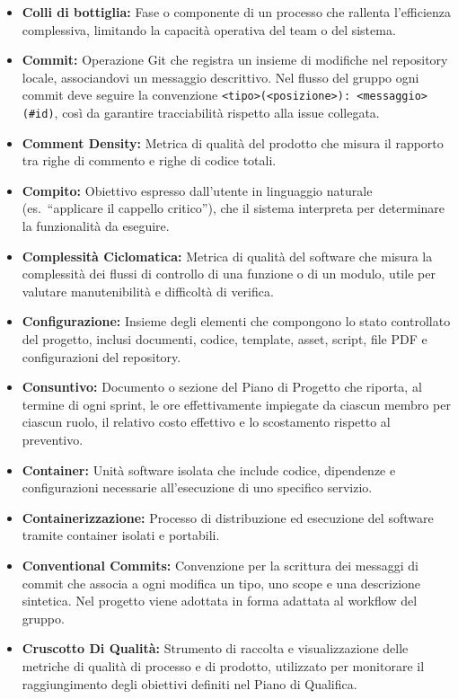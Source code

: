\begin{itemize}[leftmargin=*]
      \item \textbf{Colli di bottiglia:} Fase o componente di un processo che rallenta l'efficienza complessiva, limitando la capacità operativa del team o del sistema.
      \item \textbf{Commit:} Operazione Git che registra un insieme di modifiche nel
      repository locale, associandovi un messaggio descrittivo. Nel flusso del gruppo
      ogni commit deve seguire la convenzione
      \texttt{<tipo>(<posizione>): <messaggio> (\#id)}, così da garantire
      tracciabilità rispetto alla issue collegata.
      \item \textbf{Comment Density:} Metrica di qualità del prodotto che misura il
      rapporto tra righe di commento e righe di codice totali.
      \item \textbf{Compito:} Obiettivo espresso dall'utente in linguaggio naturale (es.\ ``applicare il cappello critico''), che il sistema interpreta per determinare la funzionalità da eseguire.
      \item \textbf{Complessità Ciclomatica:} Metrica di qualità del software che misura
      la complessità dei flussi di controllo di una funzione o di un modulo, utile per
      valutare manutenibilità e difficoltà di verifica.
      \item \textbf{Configurazione:} Insieme degli elementi che compongono lo stato controllato del progetto, inclusi documenti, codice, template, asset, script, file PDF e configurazioni del repository.
      \item \textbf{Consuntivo:} Documento o sezione del Piano di Progetto che riporta, al termine di ogni sprint, le ore effettivamente
      impiegate da ciascun membro per ciascun ruolo, il relativo costo
      effettivo e lo scostamento rispetto al preventivo.
      \item \textbf{Container:} Unità software isolata che include codice, dipendenze e configurazioni necessarie all’esecuzione di uno specifico servizio.
      \item \textbf{Containerizzazione:} Processo di distribuzione ed esecuzione del software tramite container isolati e portabili.
      \item \textbf{Conventional Commits:} Convenzione per la scrittura dei messaggi di
      commit che associa a ogni modifica un tipo, uno scope e una descrizione
      sintetica. Nel progetto viene adottata in forma adattata al workflow del gruppo.
      \item \textbf{Cruscotto Di Qualità:} Strumento di raccolta e visualizzazione delle metriche di qualità di processo e di prodotto, utilizzato per monitorare il raggiungimento degli obiettivi definiti nel Piano di Qualifica.

\end{itemize}
